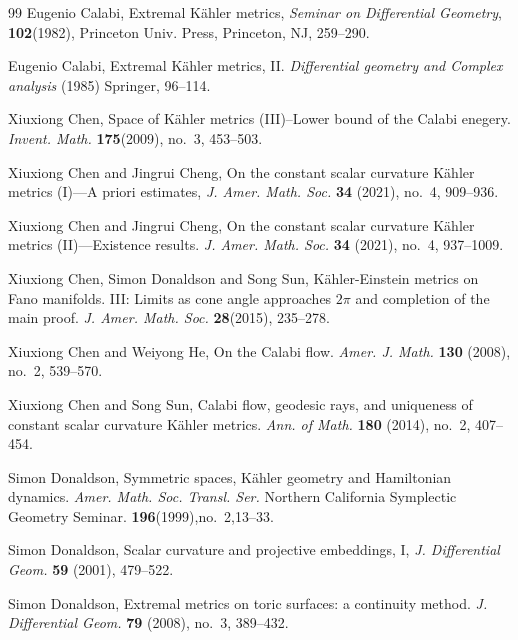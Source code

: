 \documentclass[12pt]{amsart}
\theoremstyle{plain}
\theoremstyle{definition}
\renewcommand{\>}{\rightarrow}
\renewcommand{\#}{\sharp}
\numberwithin{equation}{section} %
\begin{document}
\begin{thebibliography}{99}
    Eugenio Calabi,
    Extremal K\"ahler metrics,
    {\it Seminar on Differential Geometry},
    \textbf{102}(1982), Princeton Univ. Press, Princeton, NJ, 259--290.

    Eugenio Calabi,
    Extremal K\"ahler metrics, II.
    {\it Differential geometry and Complex analysis}
    (1985) Springer, 96--114.

    Xiuxiong Chen, Space of K\"ahler metrics (III)--Lower bound of the Calabi enegery. \emph{Invent. Math.} \textbf{175}(2009), no.~3, 453--503.




Xiuxiong Chen and Jingrui Cheng,
On the constant scalar curvature K\"ahler metrics (I)---A priori estimates,
\textit{J. Amer. Math. Soc.}
{\bf 34} (2021), no.~4, 909--936.

Xiuxiong Chen and Jingrui Cheng,
On the constant scalar curvature Kähler metrics (II)—Existence results.
\textit{J. Amer. Math. Soc.}
{\bf 34} (2021), no.~4, 937--1009.

Xiuxiong Chen, Simon Donaldson and Song Sun,
K\"ahler-Einstein metrics on Fano manifolds. III: Limits as cone angle approaches $2\pi$ and completion of the main proof.
{\it J. Amer. Math. Soc.}
{\bf 28}(2015), 235--278.


    Xiuxiong Chen and Weiyong He,
    On the Calabi flow.
    \textit{Amer. J. Math.}
    \textbf{130} (2008), no.~2, 539--570.

    Xiuxiong Chen and Song Sun,
    Calabi flow, geodesic rays, and uniqueness of constant scalar curvature K\"ahler metrics.
    \textit{Ann. of Math.}
    \textbf{180} (2014), no.~2, 407--454.


    Simon Donaldson,
    Symmetric spaces, K\"ahler geometry and Hamiltonian dynamics.
    {\it Amer. Math. Soc. Transl. Ser.} Northern California Symplectic Geometry Seminar.
    {\bf 196}(1999),no.~2,13--33.

    Simon Donaldson,
    Scalar curvature and projective embeddings, {I},
    {\it J. Differential Geom.}
    \textbf{59} (2001), 479--522.


    Simon Donaldson,
    Extremal metrics on toric surfaces: a continuity method.
    \textit{J. Differential Geom.}
    \textbf{79} (2008), no.~3, 389--432.






\end{thebibliography}
\end{document}
